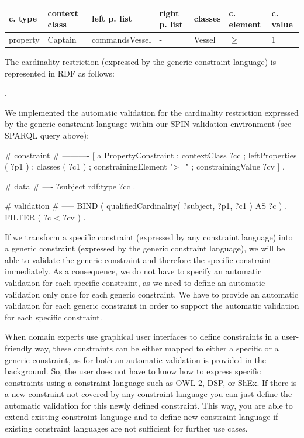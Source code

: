 \documentclass{llncs}
\newenvironment{gcotable}{
  \scriptsize
  \sffamily
  \vspace{0.3cm}
	\begin{center}
  \begin{tabular}{l|l|l|l|l|l|l}
  \hline
  \textbf{c. type} & \textbf{context class} & \textbf{left p. list} & \textbf{right p. list} & \textbf{classes} & \textbf{c. element} & \textbf{c. value} \\
  \hline

}{
  \hline
  \end{tabular}
	\end{center}
}
\begin{document}
\begin{gcotable}
property & Captain & commandsVessel & - & Vessel & $\geq$ & 1 \\
\end{gcotable}

The cardinality restriction (expressed by the generic constraint language) is represented in RDF as follows:

\begin{ex}
[   a PropertyConstraint ;
    contextClass StarFleetCaptain ;
    leftProperties ( commandsVessel ) ;
    classes ( Vessel ) ;
    constrainingElement ">=" ;
    constrainingValue "1" ] .
\end{ex}

We implemented the automatic validation for the cardinality restriction expressed by the generic constraint language within our SPIN validation environment (see SPARQL query above):

\begin{ex}
# constraint
# ----------
[   a PropertyConstraint ;
    contextClass ?cc ;
    leftProperties ( ?p1 ) ;
    classes ( ?c1 ) ;
    constrainingElement ">=" ;
    constrainingValue ?cv ] .
		
# data
# ----
?subject rdf:type ?cc .

# validation
# -----
BIND ( qualifiedCardinality( ?subject, ?p1, ?c1 ) AS ?c ) .
FILTER ( ?c < ?cv ) .		  
\end{ex}

If we transform a specific constraint (expressed by any constraint language) into a generic constraint (expressed by the generic constraint language), we will be able to validate the generic constraint and therefore the specific constraint immediately. 
As a consequence, we do not have to specify an automatic validation for each specific constraint, as we need to define an automatic validation only once for each generic constraint. 
We have to provide an automatic validation for each generic constraint in order to support the automatic validation for each specific constraint.

When domain experts use graphical user interfaces to define constraints in a user-friendly way, 
these constraints can be either mapped to either a specific or a generic constraint, as for both an automatic validation is provided in the background.    
So, the user does not have to know how to express specific constraints using a constraint language such as OWL 2, DSP, or ShEx.
If there is a new constraint not covered by any constraint language you can just define the automatic validation for this newly defined constraint.
This way, you are able to extend existing constraint language and to define new constraint language if existing constraint languages are not sufficient for further use cases.
\end{document}
